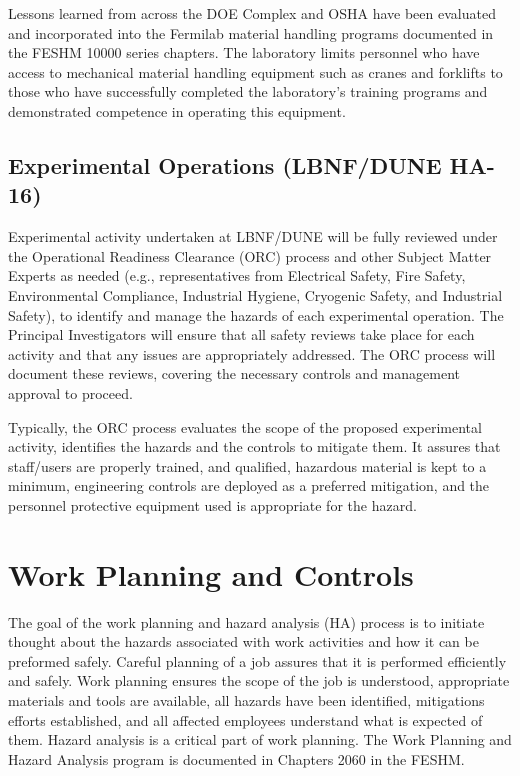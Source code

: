 Lessons learned from across the DOE Complex and OSHA have been
evaluated and incorporated into the Fermilab material handling
programs documented in the FESHM 10000 series chapters.  The
laboratory limits personnel who have access to mechanical material
handling equipment such as cranes and forklifts to those who have
successfully completed the laboratory’s training programs and
demonstrated competence in operating this equipment.


\subsection{Experimental Operations (LBNF/DUNE HA-16)}

Experimental activity undertaken at LBNF/DUNE will be fully reviewed
under the Operational Readiness Clearance (ORC) process and other
Subject Matter Experts as needed (e.g., representatives from
Electrical Safety, Fire Safety, Environmental Compliance, Industrial
Hygiene, Cryogenic Safety, and Industrial Safety), to identify and
manage the hazards of each experimental operation. The Principal
Investigators will ensure that all safety reviews take place for each
activity and that any issues are appropriately addressed. The ORC
process will document these reviews, covering the necessary controls
and management approval to proceed.

Typically, the ORC process evaluates the scope of the proposed
experimental activity, identifies the hazards and the controls to
mitigate them. It assures that staff/users are properly trained, and
qualified, hazardous material is kept to a minimum, engineering
controls are deployed as a preferred mitigation, and the personnel
protective equipment used is appropriate for the hazard.

\section{Work Planning and Controls}

The goal of the work planning and hazard analysis (HA) process is to
initiate thought about the hazards associated with work activities and
how it can be preformed safely. Careful planning of a job assures that
it is performed efficiently and safely. Work planning ensures the
scope of the job is understood, appropriate materials and tools are
available, all hazards have been identified, mitigations efforts
established, and all affected employees understand what is expected of
them. Hazard analysis is a critical part of work planning.  The Work
Planning and Hazard Analysis program is documented in Chapters 2060 in
the FESHM.


